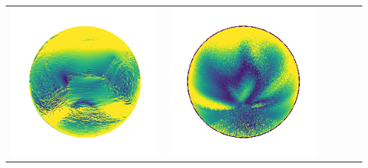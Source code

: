 \begin{center}
\begin{tabularx}{\linewidth}{@{}Y@{}Y@{}Y@{}Y@{}Y@{}Y@{}}
\includegraphics[width=\linewidth]{semisynthetic/20150514_13_yu_err.png} &
\includegraphics[width=\linewidth]{semisynthetic/20150514_13_dpsn_err.png} &

\end{tabularx}
\end{center}
